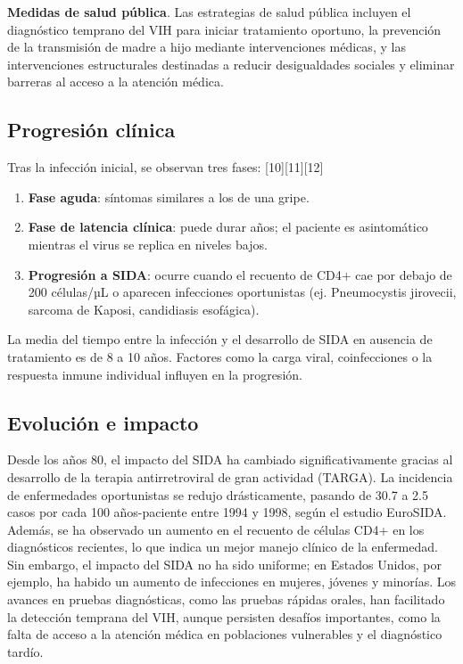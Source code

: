 \textbf{Medidas de salud pública}.
Las estrategias de salud pública incluyen el diagnóstico temprano del VIH para iniciar tratamiento oportuno, la prevención de la transmisión de madre a hijo mediante intervenciones médicas, y las intervenciones estructurales destinadas a reducir desigualdades sociales y eliminar barreras al acceso a la atención médica.

\subsection{Progresión clínica}
Tras la infección inicial, se observan tres fases: [10][11][12]
\begin{enumerate}
    \item \textbf{Fase aguda}: síntomas similares a los de una gripe.
    \item \textbf{Fase de latencia clínica}: puede durar años; el paciente es asintomático mientras el virus se replica en niveles bajos.
    \item \textbf{Progresión a SIDA}: ocurre cuando el recuento de CD4+ cae por debajo de 200 células/µL o aparecen infecciones oportunistas (ej. Pneumocystis jirovecii, sarcoma de Kaposi, candidiasis esofágica).
\end{enumerate}
La media del tiempo entre la infección y el desarrollo de SIDA en ausencia de tratamiento es de 8 a 10 años. Factores como la carga viral, coinfecciones o la respuesta inmune individual influyen en la progresión.

\subsection{Evolución e impacto}
Desde los años 80, el impacto del SIDA ha cambiado significativamente gracias al desarrollo de la terapia antirretroviral de gran actividad (TARGA). La incidencia de enfermedades oportunistas se redujo drásticamente, pasando de 30.7 a 2.5 casos por cada 100 años-paciente entre 1994 y 1998, según el estudio EuroSIDA. Además, se ha observado un aumento en el recuento de células CD4+ en los diagnósticos recientes, lo que indica un mejor manejo clínico de la enfermedad. Sin embargo, el impacto del SIDA no ha sido uniforme; en Estados Unidos, por ejemplo, ha habido un aumento de infecciones en mujeres, jóvenes y minorías. Los avances en pruebas diagnósticas, como las pruebas rápidas orales, han facilitado la detección temprana del VIH, aunque persisten desafíos importantes, como la falta de acceso a la atención médica en poblaciones vulnerables y el diagnóstico tardío.


